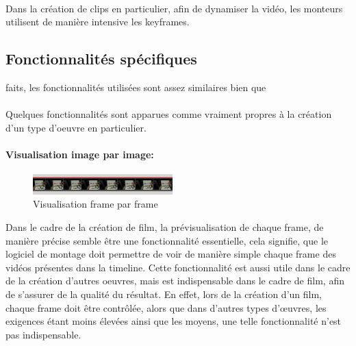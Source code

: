 \paragraph{}

Dans la création de clips en particulier, afin de dynamiser la vidéo,
les monteurs utilisent de manière intensive les keyframes.

\subsection{Fonctionnalités spécifiques} %
faits, les fonctionnalités utilisées sont assez similaires bien que

\paragraph{}

Quelques fonctionnalités sont apparues comme vraiment propres à la
création d'un type d'oeuvre en particulier.

\paragraph{Visualisation image par image:}

\begin{figure}
    \begin{center}
      \includegraphics[width=0.48\textwidth]{images/frameByFrame}
    \end{center} \caption{Visualisation frame par frame} \label{Yes}
\end{figure}

Dans le cadre de la création de film, la prévisualisation de
chaque frame, de manière précise semble être une fonctionnalité
essentielle, cela signifie, que le logiciel de montage doit permettre
de voir de manière simple chaque frame des vidéos présentes dans
la timeline. Cette fonctionnalité est aussi utile dans le cadre de
la création d'autres oeuvres, mais est indispensable dans le cadre de
film, afin de s'assurer de la qualité du résultat. En effet, lors de
la création d'un film, chaque frame doit être contrôlée, alors que
dans d'autres types d'œuvres, les exigences étant moins élevées
ainsi que les moyens, une telle fonctionnalité n'est pas indispensable.


